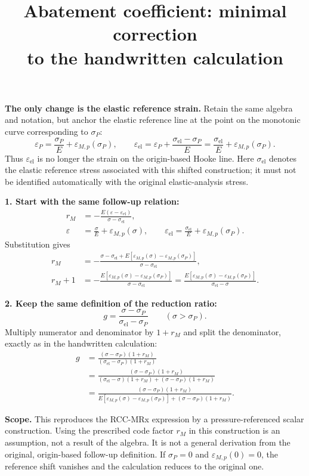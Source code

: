 \documentclass[11pt,a4paper]{article}
\title{Abatement coefficient: minimal correction\\to the handwritten calculation}
\author{}
\date{}
\begin{document}
\maketitle
\vspace{-2em}

\textbf{The only change is the elastic reference strain.}
Retain the same algebra and notation, but anchor the elastic reference
line at the point on the monotonic curve corresponding to $\sigma_P$:
\[
\varepsilon_P=\frac{\sigma_P}{E}+\varepsilon_{M,p}(\sigma_P),
\qquad
\boxed{\varepsilon_{\mathrm{el}}
=\varepsilon_P+\frac{\sigma_{\mathrm{el}}-\sigma_P}{E}
=\frac{\sigma_{\mathrm{el}}}{E}+\varepsilon_{M,p}(\sigma_P).}
\]
Thus $\varepsilon_{\mathrm{el}}$ is no longer the strain on the
origin-based Hooke line. Here $\sigma_{\mathrm{el}}$ denotes the elastic
reference stress associated with this shifted construction; it must not
be identified automatically with the original elastic-analysis stress.

\textbf{1. Start with the same follow-up relation:}
\begin{align*}
r_M&=-\frac{E(\varepsilon-\varepsilon_{\mathrm{el}})}
                  {\sigma-\sigma_{\mathrm{el}}},\\
\varepsilon&=\frac{\sigma}{E}+\varepsilon_{M,p}(\sigma),
\qquad
\varepsilon_{\mathrm{el}}=\frac{\sigma_{\mathrm{el}}}{E}
                         +\varepsilon_{M,p}(\sigma_P).
\end{align*}
Substitution gives
\begin{align*}
r_M
&=-\frac{\sigma-\sigma_{\mathrm{el}}
 +E[\varepsilon_{M,p}(\sigma)-\varepsilon_{M,p}(\sigma_P)]}
 {\sigma-\sigma_{\mathrm{el}}},\\
r_M+1
&=-\frac{E[\varepsilon_{M,p}(\sigma)-\varepsilon_{M,p}(\sigma_P)]}
 {\sigma-\sigma_{\mathrm{el}}}
=\frac{E[\varepsilon_{M,p}(\sigma)-\varepsilon_{M,p}(\sigma_P)]}
 {\sigma_{\mathrm{el}}-\sigma}.
\end{align*}

\textbf{2. Keep the same definition of the reduction ratio:}
\[
g=\frac{\sigma-\sigma_P}{\sigma_{\mathrm{el}}-\sigma_P}
\qquad(\sigma>\sigma_P).
\]
Multiply numerator and denominator by $1+r_M$ and split the denominator,
exactly as in the handwritten calculation:
\begin{align*}
g
&=\frac{(\sigma-\sigma_P)(1+r_M)}
        {(\sigma_{\mathrm{el}}-\sigma_P)(1+r_M)}\\[0.4em]
&=\frac{(\sigma-\sigma_P)(1+r_M)}
 {(\sigma_{\mathrm{el}}-\sigma)(1+r_M)
  +(\sigma-\sigma_P)(1+r_M)}\\[0.4em]
&=\boxed{\frac{(\sigma-\sigma_P)(1+r_M)}
 {E[\varepsilon_{M,p}(\sigma)-\varepsilon_{M,p}(\sigma_P)]
  +(\sigma-\sigma_P)(1+r_M)}}.
\end{align*}

\textbf{Scope.}
This reproduces the RCC-MRx expression by a pressure-referenced scalar
construction. Using the prescribed code factor $r_M$ in this construction
is an assumption, not a result of the algebra. It is not a general
derivation from the original, origin-based follow-up definition.
If $\sigma_P=0$ and $\varepsilon_{M,p}(0)=0$, the reference shift vanishes
and the calculation reduces to the original one.
\end{document}
